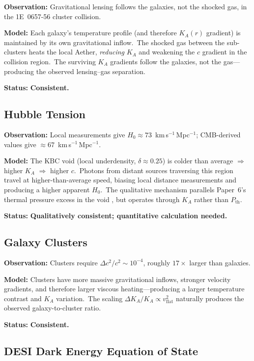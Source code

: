 \documentclass[12pt,letterpaper]{article}
\newcommand{\Ka}{K_{\!A}}
\begin{document}
\textbf{Observation:} Gravitational lensing follows the galaxies, not the
shocked gas, in the 1E~0657-56 cluster collision.

\textbf{Model:} Each galaxy's temperature profile (and therefore $\Ka(r)$
gradient) is maintained by its own gravitational inflow.\ The shocked gas
between the sub-clusters heats the local Aether, \emph{reducing} $\Ka$ and
weakening the $c$ gradient in the collision region.\ The surviving $\Ka$
gradients follow the galaxies, not the gas---producing the observed
lensing--gas separation.

\textbf{Status:} \textbf{Consistent.}


\subsection{Hubble Tension}

\textbf{Observation:} Local measurements give $H_0 \approx 73$~km\,s$^{-1}$\,Mpc$^{-1}$;
CMB-derived values give $\approx$67~km\,s$^{-1}$\,Mpc$^{-1}$.

\textbf{Model:} The KBC void (local underdensity, $\delta \approx 0.25$)
is colder than average $\Rightarrow$ higher $\Ka$ $\Rightarrow$ higher $c$.\
Photons from distant sources traversing this region travel at higher-than-average
speed, biasing local distance measurements and producing a higher apparent $H_0$.\
The qualitative mechanism parallels Paper~6's thermal pressure excess in the void
\cite{otto-cosmology}, but operates through $\Ka$ rather than $P_{\mathrm{th}}$.

\textbf{Status:} \textbf{Qualitatively consistent; quantitative calculation
needed.}


\subsection{Galaxy Clusters}

\textbf{Observation:} Clusters require $\Delta c^2/c^2 \sim 10^{-4}$,
roughly $17\times$ larger than galaxies.

\textbf{Model:} Clusters have more massive gravitational inflows, stronger
velocity gradients, and therefore larger viscous heating---producing a larger
temperature contrast and $\Ka$ variation.\ The scaling
$\Delta\Ka/\Ka \propto v_{\mathrm{flat}}^2$ naturally produces the observed
galaxy-to-cluster ratio.

\textbf{Status:} \textbf{Consistent.}


\subsection{DESI Dark Energy Equation of State}
\end{document}
